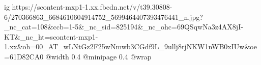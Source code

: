  
 
 
 
 

\ifcmt
  ig https://scontent-mxp1-1.xx.fbcdn.net/v/t39.30808-6/270366863_6684610604914752_5699464407393476441_n.jpg?_nc_cat=108&ccb=1-5&_nc_sid=825194&_nc_ohc=69QSqwNa3z4AX8jI-KT&_nc_ht=scontent-mxp1-1.xx&oh=00_AT_wLNtGz2F25wNmwb3CGdf9L_9ullj8rjNKW1nWB0xIUw&oe=61D82CA0
  @width 0.4
  @minipage 0.4
  @wrap \parpic[r]
\fi
